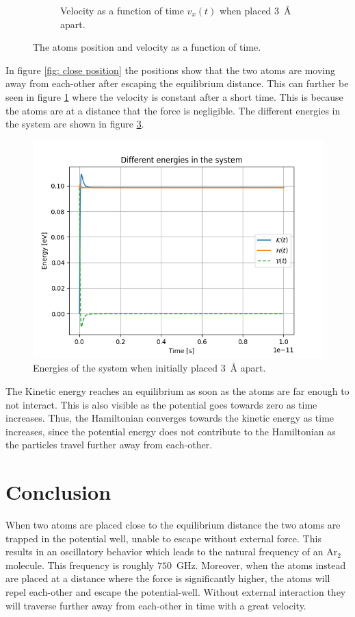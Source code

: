 \documentclass[a4paper]{article}
\begin{document}
\begin{figure}[H]
\begin{subfigure}[b]{0.45\textwidth}
        \caption{Velocity as a function of time $v_x(t)$ when placed $3$~Å apart.}
        \label{fig: close Velocity}
    \end{subfigure}
    \caption{The atoms position and velocity as a function of time.}
    \label{fig: Position & Velocity close}
\end{figure}\noindent
In figure \ref{fig: close position} the positions show that the two atoms are moving away from each-other after escaping the equilibrium distance.
This can further be seen in figure \ref{fig: close Velocity} where the velocity is constant after a short time. This is because the atoms are at a distance that the force is negligible.
The different energies in the system are shown in figure \ref{fig: close energy}.
\begin{figure}[H]
    \centering
    \includegraphics[scale = 0.5]{energies_close.png}
    \caption{Energies of the system when initially placed $3$~Å apart.}
    \label{fig: close energy}
\end{figure}\noindent
The Kinetic energy reaches an equilibrium as soon as the atoms are far enough to not interact. This is also visible as the potential goes towards zero as time increases.
Thus, the Hamiltonian converges towards the kinetic energy as time increases, since the potential energy does not contribute to the Hamiltonian as the particles travel further away from each-other.

\newpage

\section{Conclusion}
When two atoms are placed close to the equilibrium distance the two atoms are trapped in the potential well, unable to escape without external force. This results in an oscillatory behavior which leads to the natural frequency of an $\text{Ar}_2$ molecule. This frequency is roughly $750$~GHz.
Moreover, when the atoms instead are placed at a distance where the force is significantly higher, the atoms will repel each-other and escape the potential-well. Without external interaction they will traverse further away from each-other in time with a great velocity.
\end{document}
